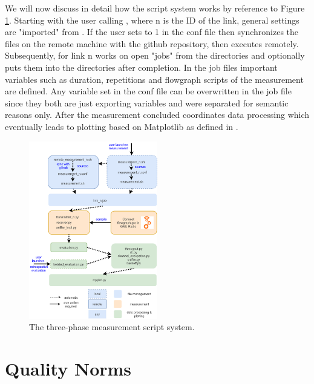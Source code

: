 We will now discuss in detail how the script system works by reference to Figure \ref{fig:script-system}.
Starting with the user calling , where n is the ID of the link, general settings are "imported" from . If the user sets  to 1 in the conf file then  synchronizes the files on the remote machine with the github repository, then executes  remotely. Subsequently,  for link n works on open "jobs" from the  directories and optionally puts them into the  directories after completion. In the job files important variables such as duration, repetitions and flowgraph scripts of the measurement are defined. Any variable set in the conf file can be overwritten in the job file since they both are just exporting variables and were separated for semantic reasons only. After the measurement concluded  coordinates data processing which eventually leads to plotting based on Matplotlib as defined in .

\begin{figure}[bt]
	\label{fig:script-system}
	\begin{center}
		\includegraphics[width=0.5\textwidth]{pictures/script_system}
	\end{center}
	\caption{The three-phase measurement script system.}
\end{figure}

\section{Quality Norms}
\label{sec:quality-standards}

